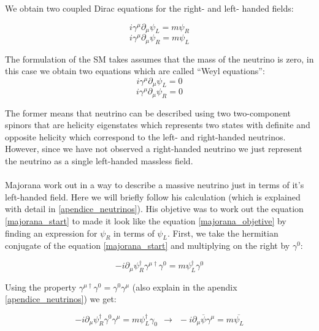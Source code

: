 We obtain two coupled Dirac equations for the right- and left- handed fields:

\begin{equation}
i \gamma ^\mu \partial_\mu \psi_L = m \psi_R
\end{equation} \label{majorana_objetive}
\begin{equation}
i \gamma ^\mu \partial_\mu \psi_R = m \psi_L
\end{equation} \label{majorana_start}

The formulation of the SM takes assumes that the mass of the neutrino is zero, in this case we obtain two equations which are called ``Weyl equations'':
\begin{equation}
i \gamma ^\mu \partial_\mu \psi_L = 0
\end{equation}
\begin{equation}
i \gamma ^\mu \partial_\mu \psi_R = 0
\end{equation}

The former means that neutrino can be described using two two-component spinors that are helicity eigenstates which represents two states with definite and opposite helicity which correspond to the left- and right-handed neutrinos. However, since we have not observed a right-handed neutrino we just represent the neutrino as a single left-handed massless field.  \\
\\
Majorana work out in a way to describe a massive neutrino just in terms of it's left-handed field. Here we will briefly follow his calculation (which is explained with detail in \ref{apendice_neutrinos}). His objetive was to work out the equation \ref{majorana_start} to made it look like the equation \ref{majorana_objetive} by finding an expression for $\psi_R$ in terms of $\psi_L$.  First, we take the hermitian conjugate of the equation \ref{majorana_start} and multiplying on the right by $\gamma^0$:

\begin{equation}
-i \partial_\mu \psi^{\dagger}_R \gamma^{\mu \dagger} \gamma^0 = m \psi^{\dagger}_L \gamma^0
\end{equation}

Using the property $\gamma^{\mu \dagger} \gamma^0 = \gamma^0 \gamma^\mu$ (also explain in the apendix \ref{apendice_neutrinos}) we get:

\begin{equation}
-i \partial_\mu \psi^{\dagger}_R \gamma^0 \gamma^\mu = m \psi^\dagger_L \gamma_0
              \ \ \rightarrow \ \ -i \partial_\mu \overline{\psi}\gamma^\mu = m \overline{\psi_L}
\end{equation}

